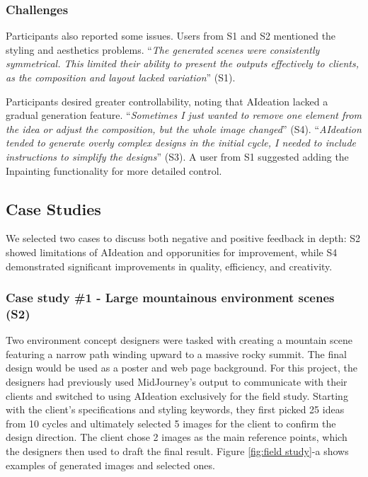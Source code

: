 \subsubsection{Challenges}
Participants also reported some issues. Users from S1 and S2 mentioned the styling and aesthetics problems. 
“\textit{The generated scenes were consistently symmetrical. This limited their ability to present the outputs effectively to clients, as the composition and layout lacked variation}” (S1).

Participants desired greater controllability, noting that AIdeation lacked a gradual generation feature. “\textit{Sometimes I just wanted to remove one element from the idea or adjust the composition, but the whole image changed}” (S4). “\textit{AIdeation tended to generate overly complex designs in the initial cycle, I needed to include instructions to simplify the designs}” (S3). A user from S1 suggested adding the Inpainting functionality for more detailed control.




\subsection{Case Studies}
We selected two cases to discuss both negative and positive feedback in depth: S2 showed limitations of AIdeation and opporunities for improvement, while S4 demonstrated significant improvements in quality, efficiency, and creativity.

\subsubsection{Case study \#1 - Large mountainous environment scenes (S2)}
Two environment concept designers were tasked with creating a mountain scene featuring a narrow path winding upward to a massive rocky summit. The final design would be used as a poster and web page background. For this project, the designers had previously used MidJourney's output to communicate with their clients and switched to using AIdeation exclusively for the field study. Starting with the client’s specifications and styling keywords, they first picked 25 ideas from 10 cycles and ultimately selected 5 images for the client to confirm the design direction. The client chose 2 images as the main reference points, which the designers then used to draft the final result. Figure \ref{fig:field study}-a shows examples of generated images and selected ones. 


